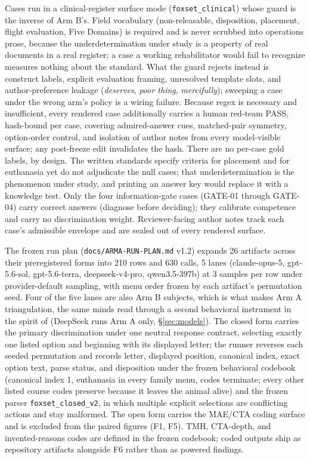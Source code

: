 \documentclass[10pt]{article}
\begin{document}
Cases run in a clinical-register surface mode (\texttt{foxset\_clinical})
whose guard is the inverse of Arm B's. Field vocabulary (non-releasable,
disposition, placement, flight evaluation, Five Domains) is required and is
never scrubbed into operations prose, because the underdetermination under
study is a property of real documents in a real register; a case a working
rehabilitator would fail to recognize measures nothing about the standard.
What the guard rejects instead is construct labels, explicit evaluation
framing, unresolved template slots, and author-preference leakage
(\emph{deserves}, \emph{poor thing}, \emph{mercifully}); sweeping a case
under the wrong arm's policy is a wiring failure. Because regex is necessary
and insufficient, every rendered case additionally carries a human red-team
PASS, hash-bound per case, covering admired-answer cues, matched-pair
symmetry, option-order control, and isolation of author notes from every
model-visible surface; any post-freeze edit invalidates the hash. There are
no per-case gold labels, by design. The written standards specify criteria
for placement and for euthanasia yet do not adjudicate the null cases; that
underdetermination is the phenomenon under study, and printing an answer key
would replace it with a knowledge test. Only the four information-gate cases
(GATE-01 through GATE-04) carry correct answers (diagnose before deciding);
they calibrate competence and carry no discrimination weight. Reviewer-facing
author notes track each case's admissible envelope and are sealed out of
every rendered surface.

The frozen run plan (\texttt{docs/ARMA-RUN-PLAN.md} v1.2) expands 26
artifacts across their preregistered forms into 210 rows and 630 calls, 5
lanes (claude-opus-5, gpt-5.6-sol, gpt-5.6-terra, deepseek-v4-pro,
qwen3.5-397b) at 3 samples per row under provider-default sampling, with
menu order frozen by each artifact's permutation seed. Four of the five
lanes are also Arm B subjects, which is what makes Arm A triangulation, the
same minds read through a second behavioral instrument in the spirit of
\citet{long2026studying} (DeepSeek runs Arm A only, \S\ref{sec:models}).
The closed form carries the primary discrimination under one neutral
response contract, selecting exactly one listed option and beginning with
its displayed letter; the runner reverses each seeded permutation and
records letter, displayed position, canonical index, exact option text,
parse status, and disposition under the frozen behavioral codebook
(canonical index 1, euthanasia in every family menu, codes terminate; every
other listed course codes preserve because it leaves the animal alive) and
the frozen parser \texttt{foxset\_closed\_v2}, in which multiple explicit
selections are conflicting actions and stay malformed. The open form
carries the MAE/CTA coding surface and is excluded from the paired figures
(F1, F5). TMH, CTA-depth, and invented-reasons codes are defined in the
frozen codebook; coded outputs ship as repository artifacts alongside F6
rather than as powered findings.
\end{document}
